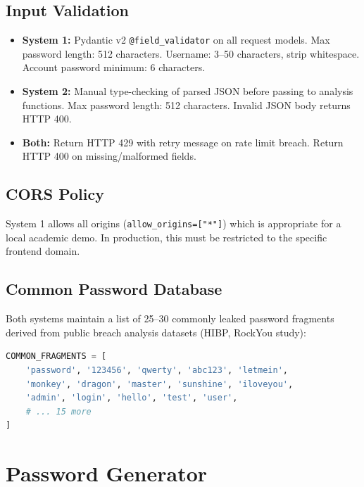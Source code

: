 \documentclass[12pt,a4paper]{article}
\begin{document}
\subsection{Input Validation}

\begin{itemize}
    \item \textbf{System 1:} Pydantic v2 \texttt{@field\_validator} on all
    request models. Max password length: 512 characters.
    Username: 3--50 characters, strip whitespace.
    Account password minimum: 6 characters.

    \item \textbf{System 2:} Manual type-checking of parsed JSON before
    passing to analysis functions. Max password length: 512 characters.
    Invalid JSON body returns HTTP 400.

    \item \textbf{Both:} Return HTTP 429 with retry message on rate limit
    breach. Return HTTP 400 on missing/malformed fields.
\end{itemize}

\subsection{CORS Policy}

System 1 allows all origins (\texttt{allow\_origins=["*"]}) which is
appropriate for a local academic demo. In production, this must be
restricted to the specific frontend domain.

\subsection{Common Password Database}

Both systems maintain a list of 25--30 commonly leaked password fragments
derived from public breach analysis datasets (HIBP, RockYou study):

\begin{lstlisting}[language=Python]
COMMON_FRAGMENTS = [
    'password', '123456', 'qwerty', 'abc123', 'letmein',
    'monkey', 'dragon', 'master', 'sunshine', 'iloveyou',
    'admin', 'login', 'hello', 'test', 'user',
    # ... 15 more
]
\end{lstlisting}

\section{Password Generator}
\end{document}
